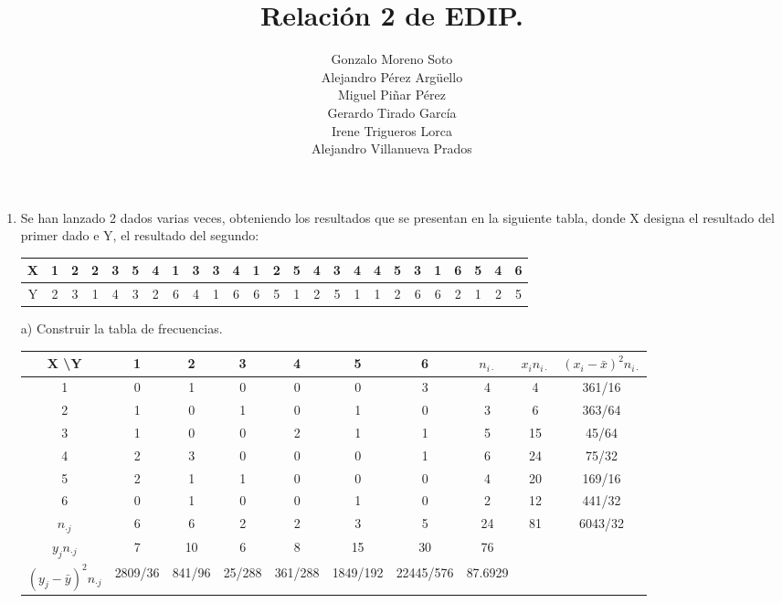 \documentclass[10pt,a4paper]{article}
\author{Gonzalo Moreno Soto\\ Alejandro Pérez Argüello\\ Miguel Piñar Pérez\\ Gerardo Tirado García\\ Irene Trigueros Lorca\\ Alejandro Villanueva Prados}
\title{Relación 2 de EDIP.}
\begin{document}
\maketitle

\begin{enumerate}
\item Se han lanzado 2 dados varias veces, obteniendo los resultados que se presentan en la siguiente tabla, donde X designa el resultado del primer dado e Y, el resultado del segundo:

\vspace{0.5cm}
\begin{tabular}{|c|c|c|c|c|c|c|c|c|c|c|c|c|c|c|c|c|c|c|c|c|c|c|c|c|}
\hline 
X & 1 & 2 & 2 & 3 & 5 & 4 & 1 & 3 & 3 & 4 & 1 & 2 & 5 & 4 & 3 & 4 & 4 & 5 & 3 & 1 & 6 & 5 & 4 & 6 \\ 
\hline 
Y & 2 & 3 & 1 & 4 & 3 & 2 & 6 & 4 & 1 & 6 & 6 & 5 & 1 & 2 & 5 & 1 & 1 & 2 & 6 & 6 & 2 & 1 & 2 & 5 \\ 
\hline 
\end{tabular} 

\vspace{0.5cm}
\hspace{0.25cm} a) Construir la tabla de frecuencias.

\vspace{0.5cm}
\begin{tabular}{|c|c|c|c|c|c|c|c|c|c|}
\hline 
X  \textbackslash  Y & 1 & 2 & 3 & 4 & 5 & 6 & $n_{i\cdot}$ & $x_in_{i\cdot}$ & $(x_i- \bar{x})^2n_{i\cdot}$ \\ 
\hline 
1 & 0 & 1 & 0 & 0 & 0 & 3 & 4 & 4 & 361/16 \\ 
\hline 
2 & 1 & 0 & 1 & 0 & 1 & 0 & 3 & 6 & 363/64 \\ 
\hline 
3 & 1 & 0 & 0 & 2 & 1 & 1 & 5 & 15 & 45/64 \\ 
\hline 
4 & 2 & 3 & 0 & 0 & 0 & 1 & 6 & 24 & 75/32 \\ 
\hline 
5 & 2 & 1 & 1 & 0 & 0 & 0 & 4 & 20 & 169/16 \\ 
\hline 
6 & 0 & 1 & 0 & 0 & 1 & 0 & 2 & 12 & 441/32 \\ 
\hline 
$n_{\cdot j}$ & 6 & 6 & 2 & 2 & 3 & 5 & 24 & 81 & 6043/32 \\ 
\hline 
$y_jn_{\cdot j}$ & 7 & 10 & 6 & 8 & 15 & 30 & 76 &  &  \\ 
\hline 
$(y_j-\bar{y})^2n_{\cdot j}$ & 2809/36 & 841/96 & 25/288 & 361/288 & 1849/192 & 22445/576 & 87.6929  &   &   \\ 
\hline 
\end{tabular} 


\end{enumerate}
\end{document}
